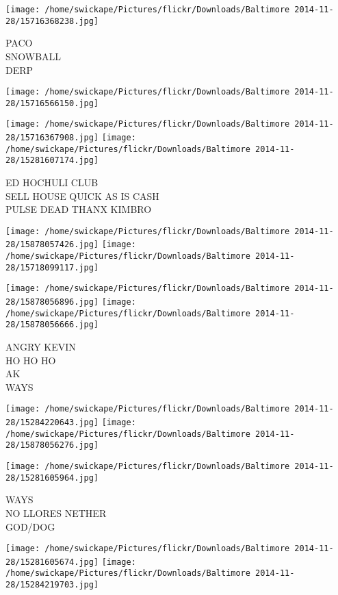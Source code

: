 \documentclass[10pt,letterpaper]{article}
\begin{document}
\texttt{[image: /home/swickape/Pictures/flickr/Downloads/Baltimore 2014-11-28/15716368238.jpg]}

PACO\\
SNOWBALL\\
DERP
\pagebreak

\texttt{[image: /home/swickape/Pictures/flickr/Downloads/Baltimore 2014-11-28/15716566150.jpg]}

\vspace{0.25in}
\texttt{[image: /home/swickape/Pictures/flickr/Downloads/Baltimore 2014-11-28/15716367908.jpg]}
\texttt{[image: /home/swickape/Pictures/flickr/Downloads/Baltimore 2014-11-28/15281607174.jpg]}

ED HOCHULI CLUB\\
SELL HOUSE QUICK AS IS CASH\\
PULSE DEAD THANX KIMBRO
\pagebreak

\texttt{[image: /home/swickape/Pictures/flickr/Downloads/Baltimore 2014-11-28/15878057426.jpg]}
\texttt{[image: /home/swickape/Pictures/flickr/Downloads/Baltimore 2014-11-28/15718099117.jpg]}

\texttt{[image: /home/swickape/Pictures/flickr/Downloads/Baltimore 2014-11-28/15878056896.jpg]}
\texttt{[image: /home/swickape/Pictures/flickr/Downloads/Baltimore 2014-11-28/15878056666.jpg]}

ANGRY KEVIN\\
HO HO HO\\
AK\\
WAYS
\pagebreak

\texttt{[image: /home/swickape/Pictures/flickr/Downloads/Baltimore 2014-11-28/15284220643.jpg]}
\texttt{[image: /home/swickape/Pictures/flickr/Downloads/Baltimore 2014-11-28/15878056276.jpg]}

\vspace{0.25in}
\texttt{[image: /home/swickape/Pictures/flickr/Downloads/Baltimore 2014-11-28/15281605964.jpg]}

WAYS\\
NO LLORES NETHER\\
GOD/DOG
\pagebreak

\texttt{[image: /home/swickape/Pictures/flickr/Downloads/Baltimore 2014-11-28/15281605674.jpg]}
\texttt{[image: /home/swickape/Pictures/flickr/Downloads/Baltimore 2014-11-28/15284219703.jpg]}
\end{document}
